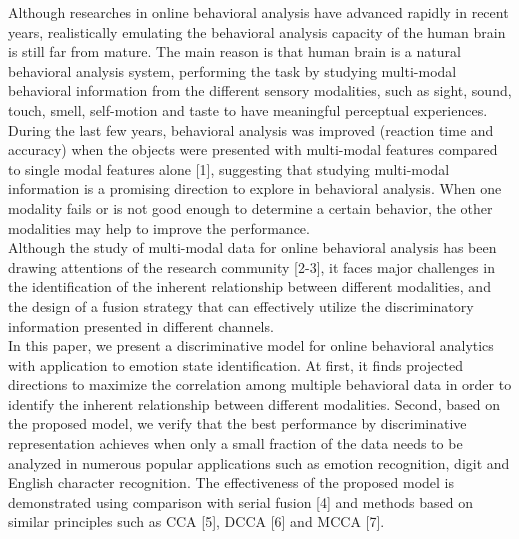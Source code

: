 \documentclass[10pt,journal,compsoc]{IEEEtran}
\begin{document}
Although researches in online behavioral analysis have advanced rapidly in recent years, realistically emulating the behavioral analysis capacity of the human brain is still far from mature. The main reason is that human brain is a natural behavioral analysis system, performing the task by studying multi-modal behavioral information from the different sensory modalities, such as sight, sound, touch, smell, self-motion and taste to have meaningful perceptual experiences. During the last few years, behavioral analysis was improved (reaction time and accuracy) when the objects were presented with multi-modal features compared to single modal features alone [1], suggesting that studying multi-modal information is a promising direction to explore in behavioral analysis. When one modality fails or is not good enough to determine a certain behavior, the other modalities may help to improve the performance.\\\indent Although the study of  multi-modal data for online behavioral analysis has been drawing attentions of the research community [2-3], it faces major challenges in the identification of the inherent relationship between different modalities, and the design of a fusion strategy that can effectively utilize the discriminatory information presented in different channels. \\\indent In this paper, we present a discriminative model for online behavioral analytics with application to emotion state identification. At first, it finds projected directions to maximize the correlation among multiple behavioral data in order to identify the inherent relationship between different modalities. Second, based on the proposed model, we verify that the best performance by discriminative representation achieves when only a small fraction of the data needs to be analyzed in numerous popular applications such as emotion recognition, digit and English character recognition. The effectiveness of the proposed model is demonstrated using comparison with serial fusion [4] and methods based on similar principles such as CCA [5], DCCA [6] and MCCA [7].
\end{document}
